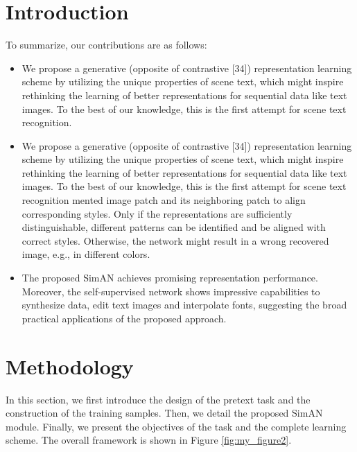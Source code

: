 \documentclass{article}
\begin{document}
\begin{multicols}{2}
    \section{Introduction}
        To summarize, our contributions are as follows:
        \begin{itemize}
            \item We propose a generative (opposite of contrastive [34])
            representation learning scheme by utilizing the unique
            properties of scene text, which might inspire rethinking the learning of better representations for sequential
            data like text images. To the best of our knowledge,
            this is the first attempt for scene text recognition.
            \item We propose a generative (opposite of contrastive [34])
            representation learning scheme by utilizing the unique
            properties of scene text, which might inspire rethinking the learning of better representations for sequential
            data like text images. To the best of our knowledge,
            this is the first attempt for scene text recognition mented image patch and its neighboring patch to align
            corresponding styles. Only if the representations are
            sufficiently distinguishable, different patterns can be
            identified and be aligned with correct styles. Otherwise, the network might result in a wrong recovered
            image, e.g., in different colors.
            \item The proposed SimAN achieves promising representation performance. Moreover, the self-supervised network shows impressive capabilities to synthesize data,
            edit text images and interpolate fonts, suggesting the
            broad practical applications of the proposed approach.
        \end{itemize}
    
    \setcounter{section}{2}
    
    
    
    \section{Methodology}
        In this section, we first introduce the design of the pretext
        task and the construction of the training samples. Then, we
        detail the proposed SimAN module. Finally, we present the
        objectives of the task and the complete learning scheme.
        The overall framework is shown in Figure \ref{fig:my_figure2}.

\end{multicols}
\end{document}
